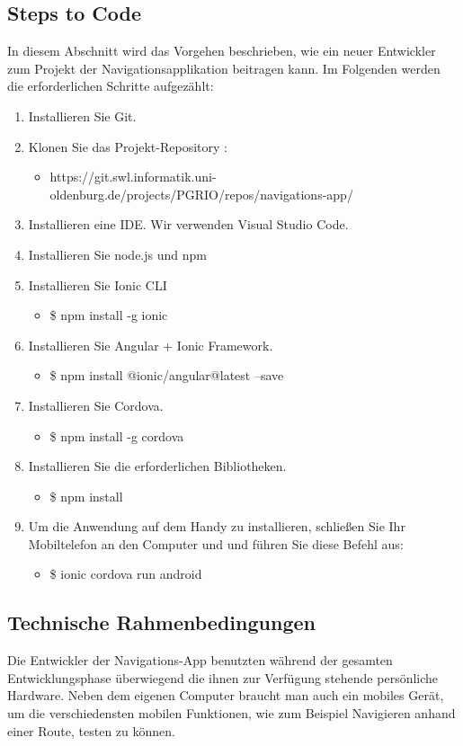 \subsection{Steps to Code}
In diesem Abschnitt wird das Vorgehen beschrieben, wie ein neuer Entwickler zum Projekt der Navigationsapplikation beitragen kann. Im Folgenden werden die erforderlichen Schritte aufgezählt: 
\begin{enumerate}
	\item Installieren Sie Git.
	\item Klonen Sie das Projekt-Repository : 
	\begin{itemize}
		\item https://git.swl.informatik.uni-oldenburg.de/projects/PGRIO/repos/navigations-app/
	\end{itemize}
	\item Installieren eine IDE. Wir verwenden Visual Studio Code.
	\item Installieren Sie node.js und npm
	\item Installieren Sie Ionic CLI
	\begin{itemize}
		\item \$ npm install -g ionic
	\end{itemize}
	\item Installieren Sie Angular + Ionic Framework.
	\begin{itemize}
		\item \$ npm install @ionic/angular@latest --save
	\end{itemize}
	\item  Installieren Sie Cordova.
	\begin{itemize}
		\item \$ npm install -g cordova
	\end{itemize}
	\item Installieren Sie die erforderlichen Bibliotheken.
	\begin{itemize}
		\item \$ npm install
	\end{itemize}
	\item Um die Anwendung auf dem Handy zu installieren, schließen Sie Ihr Mobiltelefon an den Computer und und führen Sie diese Befehl aus:
	\begin{itemize}
		\item \$ ionic cordova run android
	\end{itemize}
\end{enumerate}

\subsection{Technische Rahmenbedingungen}
Die Entwickler der Navigations-App benutzten während der gesamten Entwicklungsphase überwiegend die ihnen zur Verfügung   stehende persönliche Hardware. 
Neben dem eigenen Computer braucht man auch ein mobiles Gerät, um die verschiedensten mobilen Funktionen, wie zum Beispiel Navigieren anhand einer Route, testen zu können.
